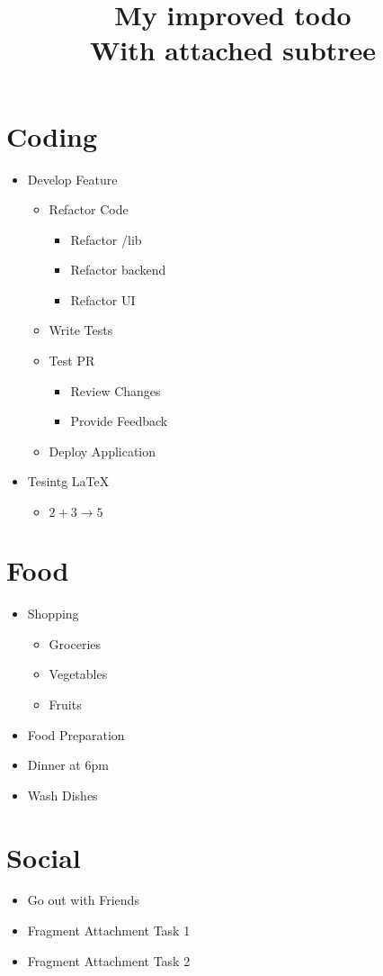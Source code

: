 \documentclass{article}
\title{
  My improved todo\\\large{
    With attached subtree
  }
}
\begin{document}
\maketitle


\section{Coding}
\begin{itemize}
  \item Develop Feature
  \begin{itemize}
    \item Refactor Code
    \begin{itemize}
      \item Refactor /lib
      \item Refactor backend
      \item Refactor UI
    \end{itemize}
    \item Write Tests
    \item Test PR
    \begin{itemize}
      \item Review Changes
      \item Provide Feedback
    \end{itemize}
    \item Deploy Application
  \end{itemize}
  \item Tesintg LaTeX
  \begin{itemize}
    \item $2 + 3 \rightarrow 5$
  \end{itemize}
\end{itemize}
\section{Food}
\begin{itemize}
  \item Shopping
  \begin{itemize}
    \item Groceries
    \item Vegetables
    \item Fruits
  \end{itemize}
  \item Food Preparation
  \item Dinner at 6pm
  \item Wash Dishes
\end{itemize}
\section{Social}
\begin{itemize}
  \item Go out with Friends
  \item Fragment Attachment Task 1
  \item Fragment Attachment Task 2
\end{itemize}


\end{document}

